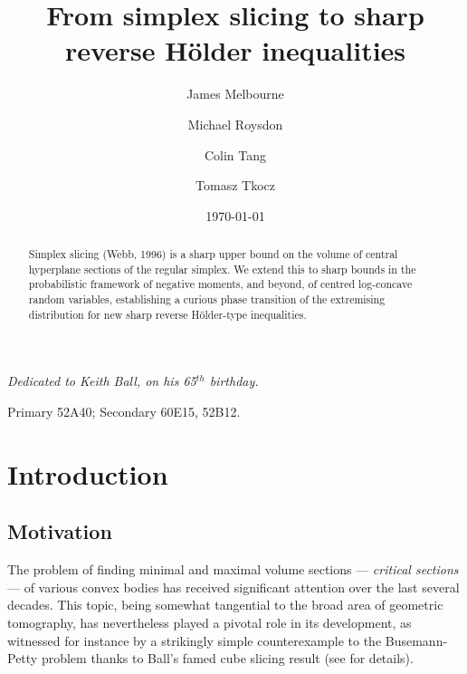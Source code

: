 \documentclass[10pt]{amsart}
\title{From simplex slicing to sharp reverse H\"older inequalities
}
\author{James Melbourne}
\author{Michael Roysdon}
\author{Colin Tang}
\author{Tomasz Tkocz}
\date{\today}
\newcommand{\1}{\textbf{1}}
\newcommand{\red}{}
\theoremstyle{remark}
\theoremstyle{definition}
\begin{document}
\begin{abstract} 
Simplex slicing (Webb, 1996) is a sharp upper bound on the volume of central hyperplane sections of the regular simplex. We extend this to sharp bounds in the probabilistic framework of negative moments, and beyond, of centred log-concave random variables, establishing a curious phase transition of the extremising distribution for new sharp reverse H\"older-type inequalities.
\end{abstract}



\maketitle


\begin{center}
\begin{large}
{\red \emph{Dedicated to Keith Ball, on his 65$^{th}$ birthday.}}
\end{large}
\end{center}



\bigskip

\begin{footnotesize}
 Primary 52A40; Secondary 60E15, 52B12.


\end{footnotesize}

\bigskip




\section{Introduction}


\subsection{Motivation}


The problem of finding minimal and maximal volume sections --- \emph{critical sections} --- of various convex bodies has received significant attention over the last several decades. This topic, being somewhat tangential to the broad area of geometric tomography, has nevertheless played a pivotal role in its development, as witnessed for instance by a strikingly simple {\red counterexample} to the Busemann-Petty problem thanks to Ball's famed cube slicing result (see \cite{Ball-cube, Ball-BP} for details). 
\end{document}
